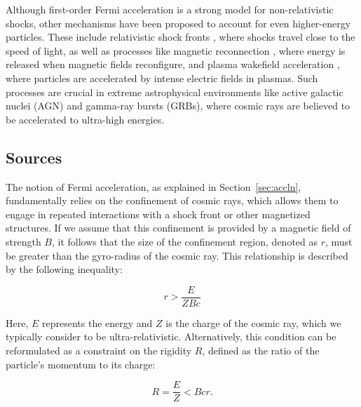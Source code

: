 Although first-order Fermi acceleration is a strong model for non-relativistic shocks, other mechanisms have been proposed to account for even higher-energy particles. These include relativistic shock fronts , where shocks travel close to the speed of light, as well as processes like magnetic reconnection , where energy is released when magnetic fields reconfigure, and plasma wakefield acceleration , where particles are accelerated by intense electric fields in plasmas. Such processes are crucial in extreme astrophysical environments like active galactic nuclei (AGN) and gamma-ray bursts (GRBs), where cosmic rays are believed to be accelerated to ultra-high energies.

\subsection{Sources}
\label{sec:cosmic_sources}
The notion of Fermi acceleration, as explained in Section~\ref{sec:accln}, fundamentally relies on the confinement of cosmic rays, which allows them to engage in repeated interactions with a shock front or other magnetized structures. If we assume that this confinement is provided by a magnetic field of strength \(B\), it follows that the size of the confinement region, denoted as \(r\), must be greater than the gyro-radius of the cosmic ray. This relationship is described by the following inequality:

\begin{equation}
    r > \frac{E}{ZBc}
\end{equation}

Here, \(E\) represents the energy and \(Z\) is the charge of the cosmic ray, which we typically consider to be ultra-relativistic. Alternatively, this condition can be reformulated as a constraint on the rigidity \(R\), defined as the ratio of the particle's momentum to its charge:

\begin{equation}
    R = \frac{E}{Z} < Bcr.
\end{equation}

